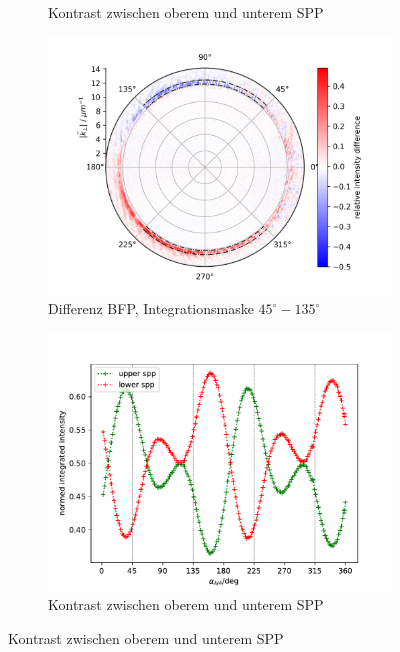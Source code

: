 \documentclass[titlepage]{article}
\begin{document}
\begin{figure}
\begin{subfigure}[b]{0.49\textwidth}
			\caption{Kontrast zwischen oberem und unterem SPP}
			\label{fig:intensity_back}
		\end{subfigure}
	
		\begin{subfigure}[b]{0.5\textwidth}
			\centering
			\includegraphics[width=\textwidth]{figures/spin_hall/diff_mid.png}
			\caption{Differenz BFP, Integrationsmaske $45^\circ-135^\circ$}
			\label{fig:diff_mid}
		\end{subfigure}
		\hfill
		\begin{subfigure}[b]{0.49\textwidth}
			\centering
			\includegraphics[width=\textwidth]{figures/spin_hall/intensity_mid.pdf}
			\caption{Kontrast zwischen oberem und unterem SPP}
			\label{fig:intensity_mid}
		\end{subfigure}
	

\end{figure}
\end{document}
